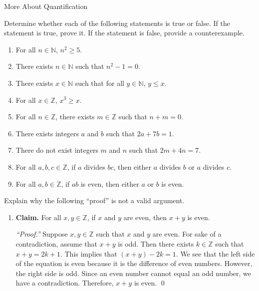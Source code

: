 \begin{section}{More About Quantification}
\begin{problem}
Determine whether each of the following statements is true or false. If the statement is true, prove it. If the statement is false, provide a counterexample.  
\begin{enumerate}[label=\textrm{(\alph*)}]
\item For all $n\in\mathbb{N}$, $n^2\geq 5$.
\item There exists $n \in \mathbb{N}$ such that $n^2-1=0$.
\item There exists $x \in \mathbb{N}$ such that for all $y \in \mathbb{N}$, $y \leq x$.
\item For all $x\in\mathbb{Z}$, $x^3\geq x$.
\item For all $n\in\mathbb{Z}$, there exists $m\in\mathbb{Z}$ such that $n+m=0$.
\item There exists integers $a$ and $b$ such that $2a+7b=1$.
\item There do not exist integers $m$ and $n$ such that $2m+4n=7$.
\item For all $a, b, c\in\mathbb{Z}$, if $a$ divides $bc$, then either $a$ divides $b$ or $a$ divides $c$.
\item For all $a, b\in\mathbb{Z}$, if $ab$ is even, then either $a$ or $b$ is even.
\end{enumerate}
\end{problem}

\begin{problem}
Explain why the following ``proof'' is not a valid argument.
\begin{enumerate}
\item[] \textbf{Claim.}  For all $x,y\in \mathbb{Z}$, if $x$ and $y$ are even, then $x+y$ is even.

\bigskip

\emph{``Proof.''}  Suppose $x, y \in \mathbb{Z}$ such that $x$ and $y$ are even.  For sake of a contradiction, assume that $x+y$ is odd.  Then there exists $k \in \mathbb{Z}$ such that $x+y=2k+1$.  This implies that $(x+y)-2k=1$.  We see that the left side of the equation is even because it is the difference of even numbers.  However, the right side is odd.  Since an even number cannot equal an odd number, we have a contradiction.  Therefore, $x+y$ is even.  \qed %
\end{enumerate}
\end{problem}


\end{section}
